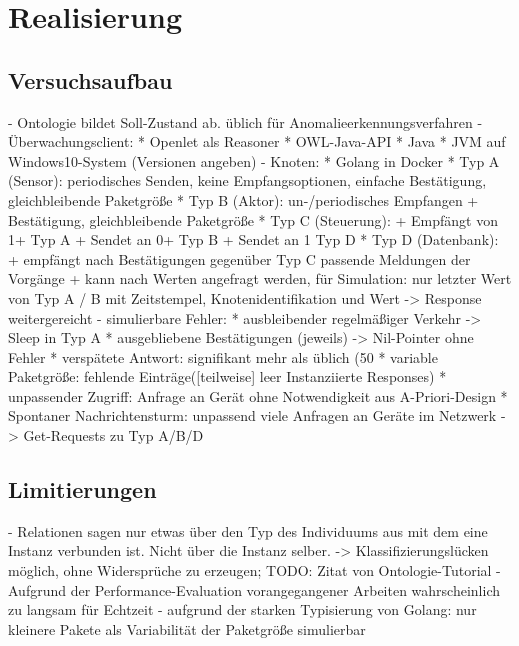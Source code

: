 \chapter{Realisierung}
\section{Versuchsaufbau}
- Ontologie bildet Soll-Zustand ab. üblich für Anomalieerkennungsverfahren \cite{ye2001anomaly}
- Überwachungsclient:
	* Openlet als Reasoner
	* OWL-Java-API
	* Java
	* JVM auf Windows10-System (Versionen angeben)
- Knoten:
	* Golang in Docker
	* Typ A (Sensor): periodisches Senden, keine Empfangsoptionen, einfache Bestätigung, gleichbleibende Paketgröße
	* Typ B (Aktor): un-/periodisches Empfangen + Bestätigung, gleichbleibende Paketgröße
	* Typ C (Steuerung):
		+ Empfängt von 1+ Typ A
		+ Sendet an 0+ Typ B
		+ Sendet an 1 Typ D
	* Typ D (Datenbank):
		+ empfängt nach Bestätigungen gegenüber Typ C passende Meldungen der Vorgänge
		+ kann nach Werten angefragt werden, für Simulation: nur letzter Wert von Typ A / B mit Zeitstempel,  Knotenidentifikation und Wert -> Response weitergereicht
- simulierbare Fehler:
	* ausbleibender regelmäßiger Verkehr -> Sleep in Typ A
	* ausgebliebene Bestätigungen (jeweils) -> Nil-Pointer ohne Fehler
	* verspätete Antwort: signifikant mehr als üblich (50%
	* variable Paketgröße: fehlende Einträge([teilweise] leer Instanziierte Responses)
	* unpassender Zugriff: Anfrage an Gerät ohne Notwendigkeit aus A-Priori-Design
	* Spontaner Nachrichtensturm: unpassend viele Anfragen an Geräte im Netzwerk -> Get-Requests zu Typ A/B/D
\section{Limitierungen}
- Relationen sagen nur etwas über den Typ des Individuums aus mit dem eine Instanz verbunden ist. Nicht über die Instanz selber. -> Klassifizierungslücken möglich, ohne Widersprüche zu erzeugen; TODO: Zitat von Ontologie-Tutorial
- Aufgrund der Performance-Evaluation vorangegangener Arbeiten wahrscheinlich zu langsam für Echtzeit \cite{roy2010exploitation}
- aufgrund der starken Typisierung von Golang: nur kleinere Pakete als Variabilität der Paketgröße simulierbar